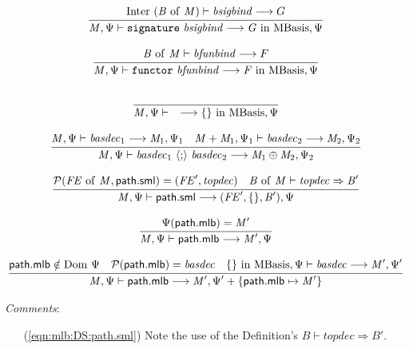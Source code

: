 \documentclass[draft]{article}
\renewcommand{\mit}[1]{\mathit{#1}}
\newcommand{\mrm}[1]{\mathrm{#1}}
\newcommand{\mtt}[1]{\mathtt{#1}}
\newcommand{\mcal}[1]{\mathcal{#1}}
\newcommand{\msf}[1]{\mathsf{#1}}
\newcommand{\infrule}[2]{{\frac{\displaystyle\strut{#1}}{\displaystyle\strut{#2}}}}
\newcommand{\judge}[2]{\infrule{#1}{#2}}
\begin{document}
\begin{equation}
\judge{
\mrm{Inter}~(\mit{B}~\mrm{of}~\mit{M}) \vdash \mit{bsigbind} \longrightarrow G
}{
\mit{M}, \Psi  \vdash \mtt{signature}~ \mit{bsigbind}
\longrightarrow \mit{G } ~\mrm{in}~ \mrm{MBasis}, \Psi
}
\end{equation}

\begin{equation}
\judge{
\mit{B}~\mrm{of}~\mit{M} \vdash \mit{bfunbind} \longrightarrow F
}{
\mit{M}, \Psi  \vdash \mtt{functor}~ \mit{bfunbind}
\longrightarrow \mit{F} ~\mrm{in}~ \mrm{MBasis}, \Psi
}
\end{equation}

\begin{equation}
\judge{
}{
\mit{M}, \Psi  \vdash \quad \longrightarrow \{\} ~\mrm{in}~ \mrm{MBasis}, \Psi
}
\end{equation}

\begin{equation}
\judge{
\mit{M}, \Psi  \vdash \mit{basdec}_1 \longrightarrow \mit{M}_1, \Psi_1 \quad
\mit{M} + \mit{M}_1, \Psi_1  \vdash \mit{basdec}_2 \longrightarrow \mit{M}_2, \Psi_2 
}{
\mit{M}, \Psi  \vdash \mit{basdec}_1 ~\langle\mtt{;}\rangle~ \mit{basdec}_2 \longrightarrow \mit{M}_1 \oplus \mit{M}_2, \Psi_2
}
\end{equation}

\begin{equation}
\label{eqn:mlb:DS:path.sml}
\judge{
\mcal{P}(\mit{FE}~\mrm{of}~\mit{M}, \msf{path.sml}) = (\mit{FE}', \mit{topdec}) \quad
\mit{B}~\mrm{of}~\mit{M} \vdash \mit{topdec} \Rightarrow \mit{B}'
}{
\mit{M}, \Psi  \vdash \msf{path.sml}  \longrightarrow (\mit{FE}',\{\},\mit{B}'), \Psi
}
\end{equation}

\begin{equation}
\judge{
\Psi(\msf{path.mlb}) = \mit{M}'
}{
\mit{M}, \Psi  \vdash \msf{path.mlb}  \longrightarrow \mit{M}', \Psi
}
\end{equation}

\begin{equation}
\judge{
\msf{path.mlb} \notin \mrm{Dom}~\Psi \quad
\mcal{P}(\msf{path.mlb}) = \mit{basdec} \quad
\{\} ~\mrm{in}~ \mrm{MBasis}, \Psi  \vdash \mit{basdec} \longrightarrow \mit{M}', \Psi'
}{
\mit{M}, \Psi  \vdash \msf{path.mlb}  \longrightarrow \mit{M}', \Psi' + \{\msf{path.mlb} \mapsto \mit{M}'\} 
}
\end{equation}

\begin{samepage}
\noindent
\textit{Comments}:
\begin{itemize}
\item[(\ref{eqn:mlb:DS:path.sml})] 
Note the use of the Definition's 
$\mit{B} \vdash \mit{topdec} \Rightarrow \mit{B}'$.
\end{itemize}
\end{samepage}
\end{document}
